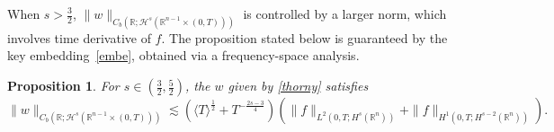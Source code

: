 \documentclass[preprint,compress,12pt]{elsarticle}
\newtheorem{proposition}[theorem]{Proposition}
\numberwithin{equation}{section}
\begin{document}
When $s>\frac{3}{2}$, $\|w\|_{C_{b}(\mathbb{R};\mathcal{H}^{s}(\mathbb{R}^{n-1}\times(0,T)))}$ is controlled by a larger norm, which involves time derivative of $f$. The proposition stated below is guaranteed by the key embedding~\eqref{embe}, obtained via a frequency-space analysis.
\begin{proposition}\label{tart}
	For $s\in\left(\frac{3}{2},\frac{5}{2}\right)$, the $w$ given by \eqref{thorny} satisfies
	\begin{equation}\label{gender} \|w\|_{C_{b}(\mathbb{R};\mathcal{H}^{s}(\mathbb{R}^{n-1}\times(0,T)))}\lesssim   \left(\langle T\rangle^{\frac{1}{2}}+T^{-\frac{2s-3}{4}}\right)\left(\|f\|_{L^{2}(0,T;H^{s}(\mathbb{R}^{n}))}+\|f\|_{H^{1}(0,T;H^{s-2}(\mathbb{R}^{n}))}\right).
	\end{equation}
\end{proposition}
\end{document}
